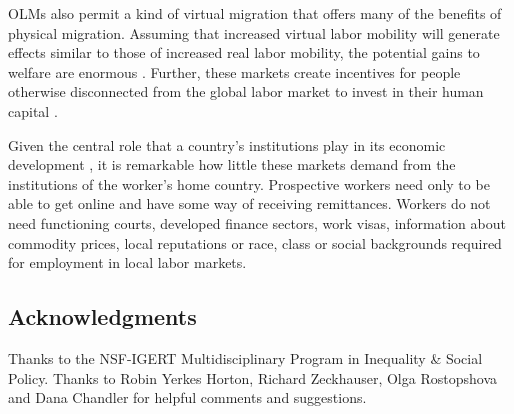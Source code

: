 \documentclass{llncs}
\begin{document}
OLMs also permit a kind of virtual migration that offers many of the
benefits of physical migration. Assuming that increased virtual labor
mobility will generate effects similar to those of increased real
labor mobility, the potential gains to welfare are enormous
\cite{clemens2008place}. Further, these markets create incentives for
people otherwise disconnected from the global labor market to invest
in their human capital \cite{osterCallCenters2010}.

Given the central role that a country's institutions play in its
economic development \cite{acemoglu-institutions}, it is remarkable how
little these markets demand from the institutions of the worker's home
country. Prospective workers need only to be able to get online and
have some way of receiving remittances. Workers do not need functioning
courts, developed finance sectors, work visas, information about
commodity prices, local reputations or race, class or social
backgrounds required for employment in local labor markets.

\subsection*{Acknowledgments} 
Thanks to the NSF-IGERT Multidisciplinary Program in Inequality \&
Social Policy. Thanks to Robin Yerkes Horton, Richard Zeckhauser, Olga
Rostopshova and Dana Chandler for helpful comments and suggestions.



\end{document}
